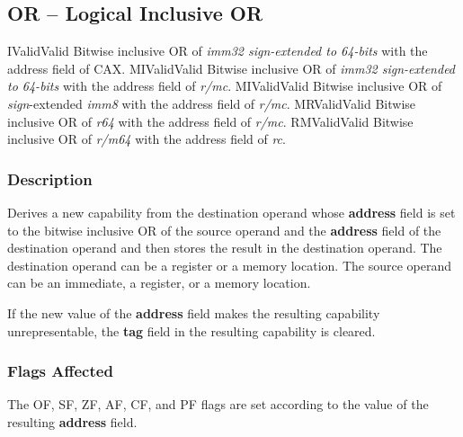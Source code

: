 \clearpage
{}
{}
\subsection*{OR -- Logical Inclusive OR}

\begin{x86opcodetable}
  {I}{Valid}{Valid}
  {Bitwise inclusive OR of \emph{imm32 sign-extended to 64-bits} with
    the address field of CAX.}
  {MI}{Valid}{Valid}
  {Bitwise inclusive OR of \emph{imm32 sign-extended to 64-bits} with
    the address field of \emph{r/mc}.}
  {MI}{Valid}{Valid}
  {Bitwise inclusive OR of \emph{sign}-extended \emph{imm8} with the
    address field of \emph{r/mc}.}
  {MR}{Valid}{Valid}
  {Bitwise inclusive OR of \emph{r64} with the address field of
    \emph{r/mc}.}
  {RM}{Valid}{Valid}
  {Bitwise inclusive OR of \emph{r/m64} with the address field of
    \emph{rc}.}
\end{x86opcodetable}

\begin{x86opentable}
\end{x86opentable}

\subsubsection*{Description}

Derives a new capability from the destination operand whose
\textbf{address} field is set to the bitwise inclusive OR of the
source operand and the \textbf{address} field of the destination
operand and then stores the result in the destination operand. The
destination operand can be a register or a memory location. The source
operand can be an immediate, a register, or a memory location.

If the new value of the \textbf{address} field makes the resulting
capability unrepresentable, the \textbf{tag} field in the resulting
capability is cleared.

\subsubsection*{Flags Affected}

The OF, SF, ZF, AF, CF, and PF flags are set according to the value of
the resulting \textbf{address} field.
